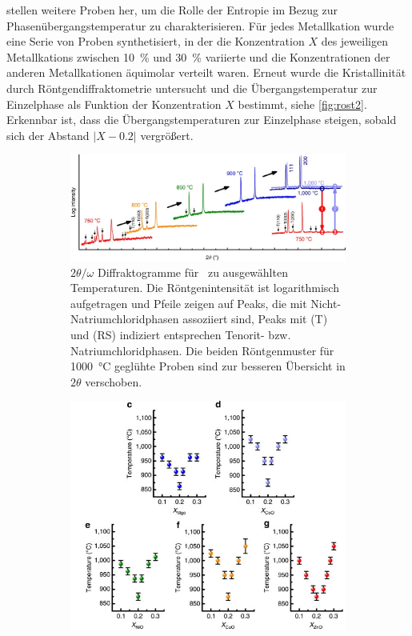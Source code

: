  stellen weitere Proben her, um die Rolle der Entropie im Bezug zur Phasenübergangstemperatur
zu charakterisieren.
Für jedes Metallkation wurde eine Serie von Proben synthetisiert, in der die Konzentration $X$ des jeweiligen
Metallkations zwischen \qty{10}{\percent} und \qty{30}{\percent} variierte und die Konzentrationen der anderen
Metallkationen äquimolar verteilt waren.
Erneut wurde die Kristallinität durch Röntgendiffraktometrie untersucht
und die Übergangstemperatur zur Einzelphase als Funktion der Konzentration $X$ bestimmt, siehe \cref{fig:rost2}.
Erkennbar ist, dass die Übergangstemperaturen zur Einzelphase steigen, sobald sich der Abstand $\lvert X-0.2 \rvert$
vergrößert.

\captionsetup{justification=justified}
\begin{figure}
    \centering
    \begin{subfigure}{0.9\textwidth}
        \centering
        \includegraphics[width=\textwidth]{../assets/theorie/rost1}
        \caption{$2 \theta/\omega$ Diffraktogramme für \heo\ zu ausgewählten Temperaturen.
        Die Röntgenintensität ist logarithmisch aufgetragen und Pfeile zeigen auf Peaks, die mit Nicht-Natriumchloridphasen
        assoziiert sind, Peaks mit (T) und (RS) indiziert entsprechen Tenorit- bzw. Natriumchloridphasen.
        Die beiden Röntgenmuster für \qty{1000}{\degreeCelsius} geglühte Proben sind zur besseren Übersicht in
            $2\theta$ verschoben.}
        \label{fig:rost1}
        \vspace*{10mm}
    \end{subfigure}
    \begin{subfigure}{0.6\textwidth}
        \centering
        \includegraphics[width=\textwidth]{../assets/theorie/rost2}

\end{subfigure}
\end{figure}
